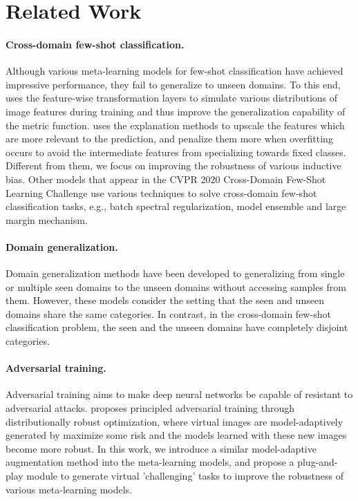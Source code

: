 \documentclass{article}
\begin{document}
\section{Related Work}
\paragraph{Cross-domain few-shot classification.} Although various meta-learning models for few-shot classification have achieved impressive performance, they fail to generalize to unseen domains. To this end, \cite{DBLP:conf/iclr/TsengLH020} uses the feature-wise transformation layers to simulate various distributions of image features during training and thus improve the generalization capability of the metric function. \cite{sun2020explanation} uses the explanation methods to upscale the features which are more relevant to the prediction, and penalize them more when overfitting occurs to avoid the intermediate features from specializing towards fixed classes. Different from them, we focus on improving the robustness of various inductive bias. Other models \cite{liu2020feature,yeh2020large} that appear in the CVPR 2020 Cross-Domain Few-Shot Learning Challenge use various techniques to solve cross-domain few-shot classification tasks, e.g., batch spectral regularization, model ensemble and large margin mechanism.

\paragraph{Domain generalization.} Domain generalization methods \cite{volpi2018generalizing,DBLP:conf/icml/LiYZH19} have been developed to generalizing from single or multiple seen domains to the unseen domains without accessing samples from them. However, these models consider the setting that the seen and unseen domains share the same categories. In contrast, in the cross-domain few-shot classification problem, the seen and the unseen domains have completely disjoint categories.

\paragraph{Adversarial training.} Adversarial training \cite{DBLP:journals/corr/GoodfellowSS14} aims to make deep neural networks be capable of resistant to adversarial attacks. \cite{DBLP:conf/iclr/SinhaND18} proposes principled adversarial training through distributionally robust optimization, where virtual images are model-adaptively generated by maximize some risk and the models learned with these new images become more robust. In this work, we introduce a similar model-adaptive augmentation method into the meta-learning models, and propose a plug-and-play module to generate virtual 'challenging' tasks to improve the robustness of various meta-learning models.
\end{document}
